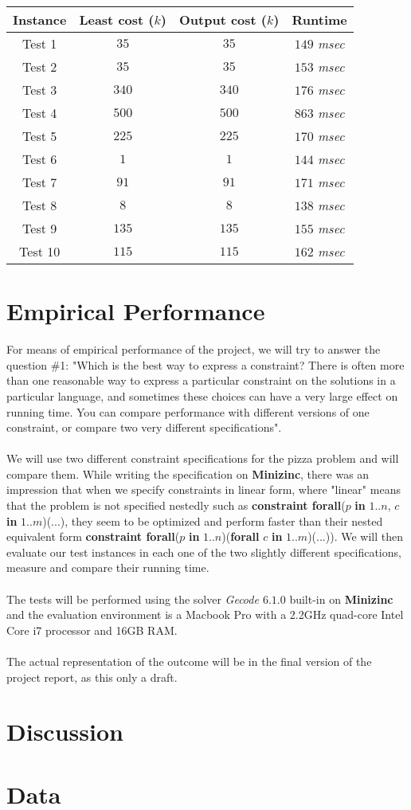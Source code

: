 \documentclass[conference]{IEEEtran}
\newcommand\tab[1][0.3cm]{\hspace*{#1}}
\begin{document}
\begin{tabular}{ c | c | c | c}
 \hline
  Instance & Least cost ($k$) & Output cost ($k$) & Runtime
  \\ \hline
      Test 1 & $35$ & $35$ & $149$ \textit{msec}\\ \hline 
      Test 2 & $35$ & $35$  &  $153$ \textit{msec}  \\ \hline
      Test 3 & $340$& $340$ &  $176$ \textit{msec} \\ \hline
      Test 4 & $500$ & $500$ &  $863$ \textit{msec} \\ \hline
      Test 5 & $225$ & $225$ &  $170$ \textit{msec} \\ \hline
      Test 6 & $1$ & $1$  &  $144$ \textit{msec} \\ \hline
      Test 7 & $91$ & $91$  &  $171$ \textit{msec} \\ \hline
      Test 8 & $8$ & $8$  &  $138$ \textit{msec} \\ \hline
      Test 9 & $135$ & $135$  &  $155$ \textit{msec} \\ \hline
      Test 10 & $115$ & $115$  &  $162$ \textit{msec} \\ \hline
  \end{tabular}
\section{Empirical Performance}
For means of empirical performance of the project, we will try to answer the question \#1: "Which is the best way to express a constraint? There is often more than one reasonable way to express a particular constraint on the solutions in a particular language, and sometimes these choices can have a very large effect on running time. You can compare performance with different versions of one constraint, or compare two very different specifications".
\\
\\
\tab We will use two different constraint specifications for the pizza problem and will compare them. While writing the specification on \textbf{Minizinc}, there was an impression that when we specify constraints in linear form, where "linear" means that the problem is not specified nestedly such as \textbf{constraint forall}($p$ \textbf{in} $1..n$, $c$ \textbf{in} $1..m$)($...$), they seem to be optimized and perform faster than their nested equivalent form \textbf{constraint forall}($p$ \textbf{in} $1..n$)(\textbf{forall} $c$ \textbf{in} $1..m$)($...$)). We will then evaluate our test instances in each one of the two slightly different specifications, measure and compare their running time.
\\
\\
\tab The tests will be performed using the solver \textit{Gecode $6.1.0$} built-in on \textbf{Minizinc} and the evaluation environment is a Macbook Pro with a 2.2GHz quad-core Intel Core i7 processor and 16GB RAM.
\\
\\
The actual representation of the outcome will be in the final version of the project report, as this only a draft.
\section{Discussion}
\section{Data}
\end{document}
